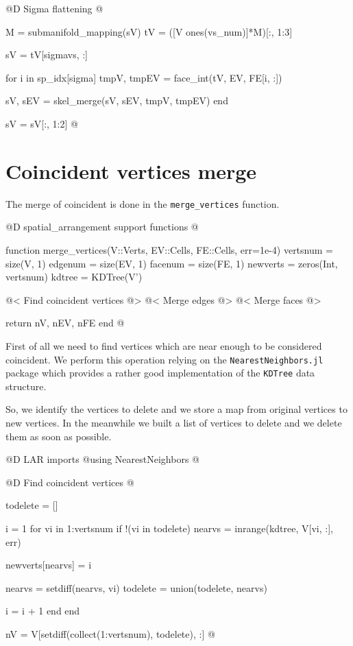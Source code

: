 @D Sigma flattening
@{M = submanifold_mapping(sV)
tV = ([V ones(vs_num)]*M)[:, 1:3]

sV = tV[sigmavs, :]

for i in sp_idx[sigma]
    tmpV, tmpEV = face_int(tV, EV, FE[i, :])
    
    sV, sEV = skel_merge(sV, sEV, tmpV, tmpEV)
end

sV = sV[:, 1:2]
@}



\section{Coincident vertices merge}
\label{sec:3D_merge_vertices}

The merge of coincident is done in the \texttt{merge\_vertices}
function.

@D spatial\_arrangement support functions
@{function merge_vertices(V::Verts, EV::Cells, FE::Cells, err=1e-4)
    vertsnum = size(V, 1)
    edgenum = size(EV, 1)
    facenum = size(FE, 1)
    newverts = zeros(Int, vertsnum)
    kdtree = KDTree(V')

    @< Find coincident vertices @>
    @< Merge edges @>
    @< Merge faces @>

    return nV, nEV, nFE
end
@}

First of all we need to find vertices which are near enough
to be considered coincident. We perform this operation
relying on the \texttt{NearestNeighbors.jl} package\cite{NearestNeighbors}
which provides a rather good implementation of the \texttt{KDTree} data structure.

So, we identify the vertices to delete and we store a map
from original vertices to new vertices. In the meanwhile
we built a list of vertices to delete and we delete them 
as soon as possible.

@D LAR imports
@{using NearestNeighbors
@}

@D Find coincident vertices
@{todelete = []

i = 1
for vi in 1:vertsnum
    if !(vi in todelete)
        nearvs = inrange(kdtree, V[vi, :], err)

        newverts[nearvs] = i

        nearvs = setdiff(nearvs, vi)
        todelete = union(todelete, nearvs)

        i = i + 1
    end
end

nV = V[setdiff(collect(1:vertsnum), todelete), :]
@}

